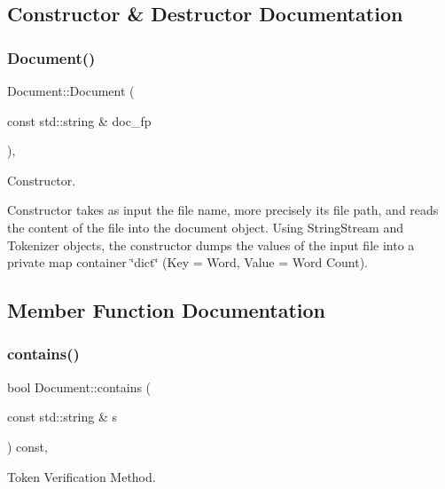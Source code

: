 \subsection{Constructor \& Destructor Documentation}
\mbox{\label{class_document_a4399bbc9420b5e5c269e9d38be5d4810}} 
\subsubsection{\texorpdfstring{Document()}{Document()}}
{\footnotesize\ttfamily Document\+::\+Document (\begin{DoxyParamCaption}\item[{const std\+::string \&}]{doc\+\_\+fp }\end{DoxyParamCaption})\hspace{0.3cm}{\ttfamily [inline]}, {\ttfamily [explicit]}}



Constructor. 

Constructor takes as input the file name, more precisely its file path, and reads the content of the file into the document object. Using String\+Stream and Tokenizer objects, the constructor dumps the values of the input file into a private map container \char`\"{}dict\char`\"{} (Key = Word, Value = Word Count). 

\subsection{Member Function Documentation}
\mbox{\label{class_document_a68e12b27c40699cd3c2fff66a6161473}} 
\subsubsection{\texorpdfstring{contains()}{contains()}}
{\footnotesize\ttfamily bool Document\+::contains (\begin{DoxyParamCaption}\item[{const std\+::string \&}]{s }\end{DoxyParamCaption}) const\hspace{0.3cm}{\ttfamily [override]}, {\ttfamily [virtual]}}



Token Verification Method. 


